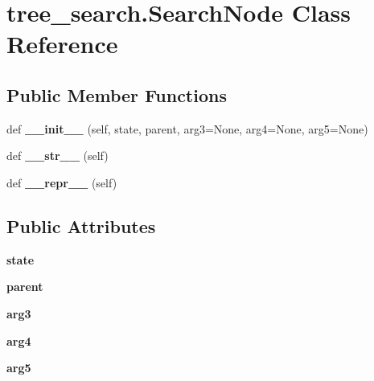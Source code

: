 \hypertarget{classtree__search_1_1_search_node}{}\section{tree\+\_\+search.\+Search\+Node Class Reference}
\label{classtree__search_1_1_search_node}
\subsection*{Public Member Functions}
\begin{DoxyCompactItemize}
\item 
\mbox{\label{classtree__search_1_1_search_node_a32f14cbd2c99bb24df8d4117f68ae5a7}} 
def {\bfseries \+\_\+\+\_\+init\+\_\+\+\_\+} (self, state, parent, arg3=None, arg4=None, arg5=None)
\item 
\mbox{\label{classtree__search_1_1_search_node_a923a3cf5e60b241db2dbe14a97b58bc0}} 
def {\bfseries \+\_\+\+\_\+str\+\_\+\+\_\+} (self)
\item 
\mbox{\label{classtree__search_1_1_search_node_a9762523c06038557685366ff18cd771c}} 
def {\bfseries \+\_\+\+\_\+repr\+\_\+\+\_\+} (self)
\end{DoxyCompactItemize}
\subsection*{Public Attributes}
\begin{DoxyCompactItemize}
\item 
\mbox{\label{classtree__search_1_1_search_node_ad08ba1c682f6ee2579d79ef3626f312e}} 
{\bfseries state}
\item 
\mbox{\label{classtree__search_1_1_search_node_ac9fb3851d46776c094513302f19dd3e6}} 
{\bfseries parent}
\item 
\mbox{\label{classtree__search_1_1_search_node_a06d57345d564ca8ad776d23764d384bb}} 
{\bfseries arg3}
\item 
\mbox{\label{classtree__search_1_1_search_node_ab90edcbd04d2b17eb5023d72464f6505}} 
{\bfseries arg4}
\item 
\mbox{\label{classtree__search_1_1_search_node_a9ae5b9f4a246417c90f7af2de66c8eaf}} 
{\bfseries arg5}
\end{DoxyCompactItemize}


